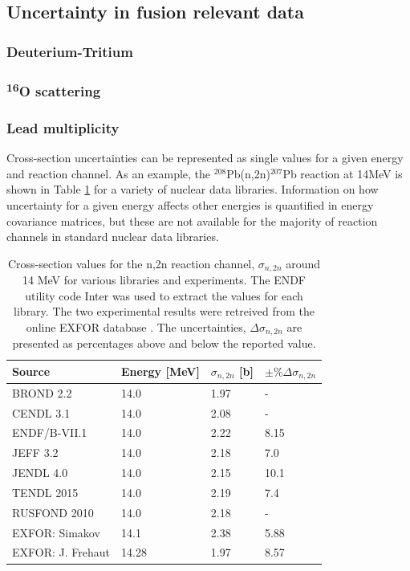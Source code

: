\subsection{Uncertainty in fusion relevant data}
  \cite{Forrest2011}
\subsubsection{Deuterium-Tritium}
\subsubsection{\textsuperscript{16}O scattering}
\subsubsection{Lead multiplicity}

Cross-section uncertainties can be represented as single values for a given energy and reaction channel. As an example, the $^{208}$Pb(n,2n)$^{207}$Pb reaction at 14MeV is shown in Table \ref{tab:lead_by_lib} for a variety of nuclear data libraries. Information on how uncertainty for a given energy affects other energies is quantified in energy covariance matrices, but these are not available for the majority of reaction channels in standard nuclear data libraries.

\begin{table}[ht]
  \footnotesize
  \centering
  \begin{tabularx}{\textwidth}{XXXX}
    \toprule
    Source & Energy [MeV] & $\sigma_{n,2n}$ [b] & $\pm\%\Delta\sigma_{n,2n}$ \\
    \midrule
    BROND 2.2 & 14.0 & 1.97 & - \\
    CENDL 3.1 & 14.0 & 2.08 & - \\
    ENDF/B-VII.1 & 14.0 & 2.22 & 8.15 \\
    JEFF 3.2 & 14.0 & 2.18 & 7.0 \\
    JENDL 4.0 & 14.0 & 2.15 & 10.1 \\
    TENDL 2015 & 14.0 & 2.19 & 7.4 \\
    RUSFOND 2010 & 14.0 & 2.18 & - \\
    EXFOR: Simakov & 14.1 & 2.38 & 5.88 \\
    EXFOR: J. Frehaut & 14.28 & 1.97 & 8.57 \\
    \bottomrule
  \end{tabularx}
  \caption{Cross-section values for the n,2n reaction channel, $\sigma_{n,2n}$ around 14 MeV for various libraries and experiments. The ENDF utility code Inter \cite{inter} was used to extract the values for each library. The two experimental results were retreived from the online EXFOR database \cite{exfor2017}. The uncertainties, $\Delta\sigma_{n,2n}$ are presented as percentages above and below the reported value.}
  \label{tab:lead_by_lib}
\end{table}

